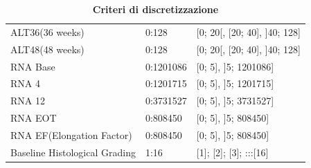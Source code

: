 \begin{table}[ht]
{\begin{minipage}{\textwidth}
\begin{tabular}{lll}
ALT36(36 weeks)               & 0:128      & {[}0; 20[, [20; 40], ]40; 128]                                                                                                                         \\
ALT48(48 weeks)               & 0:128      & {[}0; 20[, [20; 40], ]40; 128]                                                                                                                         \\
RNA Base                      & 0:1201086       & {[}0; 5], ]5; 1201086]                                                                                                                                 \\
RNA 4                         & 0:1201715       & {[}0; 5], ]5; 1201715]                                                                                                                                 \\
RNA 12                        & 0:3731527       & {[}0; 5], ]5; 3731527]                                                                                                                                 \\
RNA EOT                       & 0:808450        & {[}0; 5], ]5; 808450]                                                                                                                                  \\
RNA EF(Elongation Factor)     & 0:808450        & {[}0; 5], ]5; 808450]                                                                                                                                  \\
Baseline Histological Grading & 1:16            & {[}1]; [2]; [3]; :::[16]                                                                                                                               \\
                                                     
\end{tabular}\label{tab:tab1}
\end{minipage}}
\caption{\textbf{Criteri di discretizzazione}}
\end{table}

